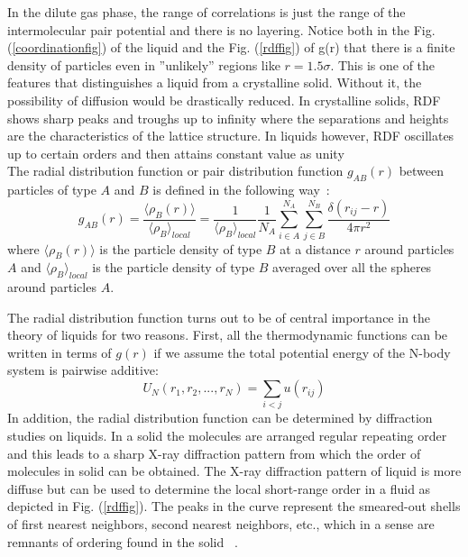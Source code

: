 \begin{sloppypar}
 In the dilute gas phase, the range of correlations is just the range of
 the intermolecular pair potential and there is no layering.   Notice both in the  Fig. (\ref{coordinationfig}) of the liquid  and the Fig. (\ref{rdffig}) of g(r)  that there is a finite density of particles even in ''unlikely'' regions  like $r = 1.5 \sigma $. This is one of the features that distinguishes a liquid from a crystalline solid. Without it, the possibility of diffusion would  be drastically reduced. In crystalline solids, RDF shows sharp peaks and troughs up to infinity where the separations and heights are  the characteristics of the lattice structure. In liquids however, RDF oscillates up to  certain orders and then attains constant value as unity~\citep{chandler1987, mcquarrie2000}\\
 The radial distribution function or pair distribution function $g_{AB}(r)$ between particles of type $A$ and $B$ is defined in the following way~\citep{Gromacs-manual}: 
 \begin{equation}
 g_{AB}(r) = \frac{\langle \rho_B (r) \rangle}{\langle \rho_B \rangle_{local}} = \frac{1}{\langle \rho_B \rangle_{local}} \frac{1}{N_A}  \sum_{i\in A}^{N_A} \sum_{j\in B}^{N_B} \frac{\delta(r_{ij}-r)}{4\pi r^2}
  \end{equation}
  where $\langle \rho_B (r) \rangle$ is the particle density of type $B$ at a distance $r$ around particles $A$ and  $\langle \rho_B \rangle_{local}$ is the particle density of type $B$ averaged over all the spheres around particles  $ A$.
  \end{sloppypar} 
  The radial distribution function turns out to be of central importance in the theory of liquids for two reasons. First, all the thermodynamic functions can be written in terms of $g(r)$ if we assume the total potential energy of the N-body system is pairwise additive: 
  \begin{equation}
 U_N(r_1, r_2, ..., r_N) = \sum_{i<j} u(r_{ij})
 \end{equation}
 In addition, the radial distribution function can be determined by diffraction studies on liquids. In a solid the molecules are arranged regular repeating order and this leads to a sharp X-ray diffraction pattern from which the order of molecules in solid can be obtained. The X-ray diffraction pattern of liquid is more diffuse but can be used to determine the local short-range order in a fluid as depicted in Fig. (\ref{rdffig}). The peaks in the curve represent the smeared-out shells of first nearest neighbors, second nearest neighbors, etc., which in a sense are remnants of ordering found in the solid ~\citep{chandler1987, mcquarrie2000}. 
 
